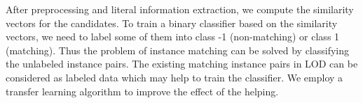 After preprocessing and literal information extraction, we compute the similarity vectors for the candidates. To train a binary classifier based on the similarity vectors, we need to label some of them into class -1 (non-matching) or class 1 (matching). Thus the problem of instance matching can be solved by classifying the unlabeled instance pairs. The existing matching instance pairs in LOD can be considered as labeled data which may help to train the classifier. We employ a transfer learning algorithm to improve the effect of the helping.
